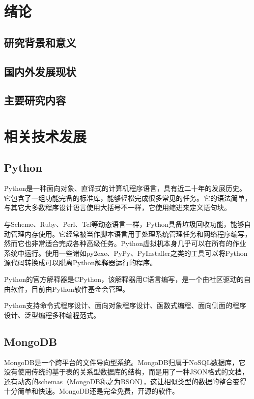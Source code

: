 \iffalse

\fi
\section{绪论}

\subsection{研究背景和意义}


\subsection{国内外发展现状}

\subsection{主要研究内容}

\section{相关技术发展}

\subsection{Python}

Python是一种面向对象、直译式的计算机程序语言，具有近二十年的发展历史。它包含了一组功能完备的标准库，能够轻松完成很多常见的任务。它的语法简单，与其它大多数程序设计语言使用大括号不一样，它使用缩进来定义语句块。

与Scheme、Ruby、Perl、Tcl等动态语言一样，Python具备垃圾回收功能，能够自动管理内存使用。它经常被当作脚本语言用于处理系统管理任务和网络程序编写，然而它也非常适合完成各种高级任务。Python虚拟机本身几乎可以在所有的作业系统中运行。使用一些诸如py2exe、PyPy、PyInstaller之类的工具可以将Python源代码转换成可以脱离Python解释器运行的程序。

Python的官方解释器是CPython，该解释器用C语言编写，是一个由社区驱动的自由软件，目前由Python软件基金会管理。

Python支持命令式程序设计、面向对象程序设计、函数式编程、面向侧面的程序设计、泛型编程多种编程范式。\cite{python}

\subsection{MongoDB}

MongoDB是一个跨平台的文件导向型系统。MongoDB归属于NoSQL数据库，它没有使用传统的基于表的关系型数据库的结构，而是用了一种JSON格式的文档，还有动态的schemas（MongoDB称之为BSON），这让相似类型的数据的整合变得十分简单和快速。MongoDB还是完全免费，开源的软件。

